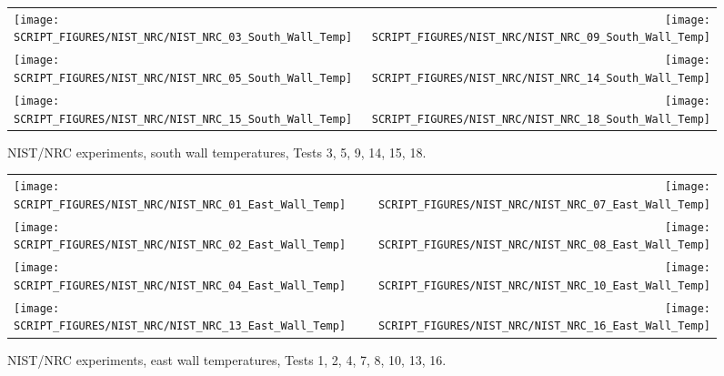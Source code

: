 \begin{figure}[p]
\begin{tabular*}{\textwidth}{l@{\extracolsep{\fill}}r}
\texttt{[image: SCRIPT\_FIGURES/NIST\_NRC/NIST\_NRC\_03\_South\_Wall\_Temp]} &
\texttt{[image: SCRIPT\_FIGURES/NIST\_NRC/NIST\_NRC\_09\_South\_Wall\_Temp]} \\
\texttt{[image: SCRIPT\_FIGURES/NIST\_NRC/NIST\_NRC\_05\_South\_Wall\_Temp]} &
\texttt{[image: SCRIPT\_FIGURES/NIST\_NRC/NIST\_NRC\_14\_South\_Wall\_Temp]} \\
\texttt{[image: SCRIPT\_FIGURES/NIST\_NRC/NIST\_NRC\_15\_South\_Wall\_Temp]} &
\texttt{[image: SCRIPT\_FIGURES/NIST\_NRC/NIST\_NRC\_18\_South\_Wall\_Temp]}
\end{tabular*}
\caption[NIST/NRC experiments, south wall temperatures, Tests 3, 5, 9, 14, 15, 18]{NIST/NRC experiments, south wall temperatures, Tests 3, 5, 9, 14, 15, 18.}
\label{NIST_NRC_South_Wall_Temp_Open}
\end{figure}

\begin{figure}[p]
\begin{tabular*}{\textwidth}{l@{\extracolsep{\fill}}r}
\texttt{[image: SCRIPT\_FIGURES/NIST\_NRC/NIST\_NRC\_01\_East\_Wall\_Temp]} &
\texttt{[image: SCRIPT\_FIGURES/NIST\_NRC/NIST\_NRC\_07\_East\_Wall\_Temp]} \\
\texttt{[image: SCRIPT\_FIGURES/NIST\_NRC/NIST\_NRC\_02\_East\_Wall\_Temp]} &
\texttt{[image: SCRIPT\_FIGURES/NIST\_NRC/NIST\_NRC\_08\_East\_Wall\_Temp]} \\
\texttt{[image: SCRIPT\_FIGURES/NIST\_NRC/NIST\_NRC\_04\_East\_Wall\_Temp]} &
\texttt{[image: SCRIPT\_FIGURES/NIST\_NRC/NIST\_NRC\_10\_East\_Wall\_Temp]} \\
\texttt{[image: SCRIPT\_FIGURES/NIST\_NRC/NIST\_NRC\_13\_East\_Wall\_Temp]} &
\texttt{[image: SCRIPT\_FIGURES/NIST\_NRC/NIST\_NRC\_16\_East\_Wall\_Temp]}
\end{tabular*}
\caption[NIST/NRC experiments, east wall temperatures, Tests 1, 2, 4, 7, 8, 10, 13, 16]{NIST/NRC experiments, east wall temperatures, Tests 1, 2, 4, 7, 8, 10, 13, 16.}
\label{NIST_NRC_East_Wall_Temp_Closed}
\end{figure}

